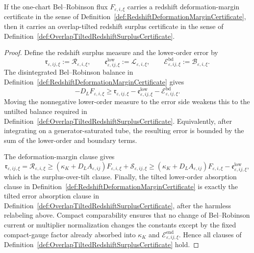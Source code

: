 \begin{theorem}\label{thm:DeformationMarginProducesRedshiftSurplus}
If the one-chart Bel--Robinson flux $F_{\varepsilon,i,\xi}$ carries a redshift deformation-margin certificate in the sense of Definition~\ref{def:RedshiftDeformationMarginCertificate}, then it carries an overlap-tilted redshift surplus certificate in the sense of Definition~\ref{def:OverlapTiltedRedshiftSurplusCertificate}.
\end{theorem}

\begin{proof}
Define the redshift surplus measure and the lower-order error by
\[
    \mathfrak r_{\varepsilon,ij,\xi}
    :=
    \mathcal R_{\varepsilon,i,\xi},
    \qquad
    \mathfrak e^{\mathrm{low}}_{\varepsilon,ij,\xi}
    :=
    \mathcal L_{\varepsilon,i,\xi},
    \qquad
    \mathcal E^{\mathrm{bd}}_{\varepsilon,ij,\xi}
    :=
    \mathcal B_{\varepsilon,i,\xi}.
\]
The disintegrated Bel--Robinson balance in Definition~\ref{def:RedshiftDeformationMarginCertificate} gives
\[
    -D_LF_{\varepsilon,i,\xi}
    \ge
    \mathfrak r_{\varepsilon,ij,\xi}
    -
    \mathfrak e^{\mathrm{low}}_{\varepsilon,ij,\xi}
    -
    \mathcal E^{\mathrm{bd}}_{\varepsilon,ij,\xi}.
\]
Moving the nonnegative lower-order measure to the error side weakens this to the untilted balance required in Definition~\ref{def:OverlapTiltedRedshiftSurplusCertificate}.  Equivalently, after integrating on a generator-saturated tube, the resulting error is bounded by the sum of the lower-order and boundary terms.

The deformation-margin clause gives
\[
    \mathfrak r_{\varepsilon,ij,\xi}
    =
    \mathcal R_{\varepsilon,i,\xi}
    \ge
    \left(\kappa_K+D_LA_{\varepsilon,ij}\right)
    F_{\varepsilon,i,\xi}
    +
    \mathcal S_{\varepsilon,ij,\xi}
    \ge
    \left(\kappa_K+D_LA_{\varepsilon,ij}\right)
    F_{\varepsilon,i,\xi}
    -
    \mathfrak e^{\mathrm{low}}_{\varepsilon,ij,\xi},
\]
which is the surplus-over-tilt clause.  Finally, the tilted lower-order absorption clause in Definition~\ref{def:RedshiftDeformationMarginCertificate} is exactly the tilted error absorption clause in Definition~\ref{def:OverlapTiltedRedshiftSurplusCertificate}, after the harmless relabeling above.  Compact comparability ensures that no change of Bel--Robinson current or multiplier normalization changes the constants except by the fixed compact-gauge factor already absorbed into $\kappa_K$ and $\mathcal E^{\mathrm{end}}_{\varepsilon,ij,\xi}$.  Hence all clauses of Definition~\ref{def:OverlapTiltedRedshiftSurplusCertificate} hold.
\end{proof}

